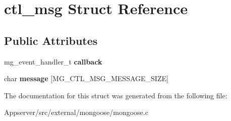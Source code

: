 \hypertarget{structctl__msg}{}\section{ctl\+\_\+msg Struct Reference}
\label{structctl__msg}
\subsection*{Public Attributes}
\begin{DoxyCompactItemize}
\item 
mg\+\_\+event\+\_\+handler\+\_\+t {\bfseries callback}\hypertarget{structctl__msg_a62d9f57eca85bcecf123ae9046d97972}{}\label{structctl__msg_a62d9f57eca85bcecf123ae9046d97972}

\item 
char {\bfseries message} \mbox{[}M\+G\+\_\+\+C\+T\+L\+\_\+\+M\+S\+G\+\_\+\+M\+E\+S\+S\+A\+G\+E\+\_\+\+S\+I\+ZE\mbox{]}\hypertarget{structctl__msg_a07e117d1bf333976cd03507b0c1538b0}{}\label{structctl__msg_a07e117d1bf333976cd03507b0c1538b0}

\end{DoxyCompactItemize}


The documentation for this struct was generated from the following file\+:\begin{DoxyCompactItemize}
\item 
Appserver/src/external/mongoose/mongoose.\+c\end{DoxyCompactItemize}
